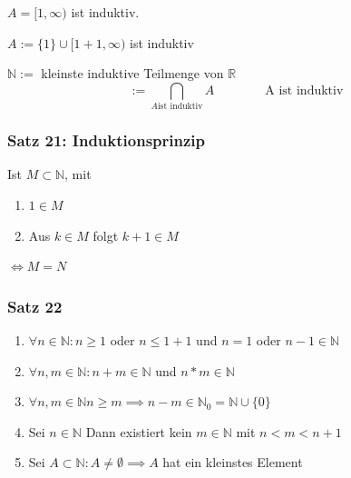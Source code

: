 \documentclass[fleqn]{scrartcl}
\newenvironment{example}{{\bfseries Beispiel }}{}
\begin{document}
\begin{example}

$A= [1,\infty)$ ist induktiv.

$A:= \{1\} \cup [1+1,\infty)$ ist induktiv
\end{example}

$\mathbb{N}:=$ kleinste induktive Teilmenge von $\mathbb{R}$
\[:= \bigcap_{A \text{ist induktiv}} A \qquad\qquad \text{A ist induktiv}\]

\subsubsection{Satz 21: Induktionsprinzip}

Ist $M \subset \mathbb{N}$, mit 

\begin{enumerate}
  \item $1 \in M$
  \item Aus $k \in M$ folgt $k+1 \in M$
\end{enumerate}

$\Longleftrightarrow M = N$

\subsubsection{Satz 22}
\begin{enumerate}[1)]
\item $\forall n \in \mathbb{N}: n \geq 1$ oder $n \leq 1 + 1$ und $n = 1$ oder $n-1 \in \mathbb{N}$
\item $\forall n,m \in \mathbb{N}: n+m \in \mathbb{N}$ und $n*m \in \mathbb{N}$
\item $\forall n,m \in \mathbb{N} n \geq m \implies n-m \in \mathbb{N}_0 = \mathbb{N} \cup \{0\}$
\item Sei $n \in \mathbb{N}$ Dann existiert kein $m \in \mathbb{N}$ mit $n < m < n+1$
\item Sei $A \subset \mathbb{N}: A \neq \emptyset \implies A$ hat ein kleinstes Element
\end{enumerate}
\end{document}
